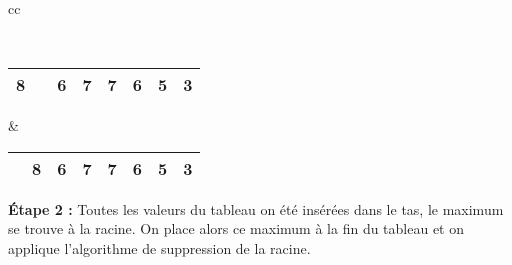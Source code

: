 \begin{tabular}{cc}
{{}}
\\
\begin{tabular}{|c|c|c|c|c|c|c|c||}
\hline
8 &  \red{10} & 6 & 7 & 7 & 6 & 5 & 3\\
\hline
\end{tabular}
&
\begin{tabular}{|c|c|c|c|c|c|c|c||}
\hline
 \red{10} & 8 & 6 & 7 & 7 & 6 & 5 & 3\\
\hline
\end{tabular}
\end{tabular}

\vspace{0.5cm}

\textbf{\'Etape 2 : } Toutes les valeurs du tableau on été insérées dans le tas, le maximum se trouve à la racine. On place alors ce maximum à la fin du tableau et on applique l'algorithme de suppression de la racine.

